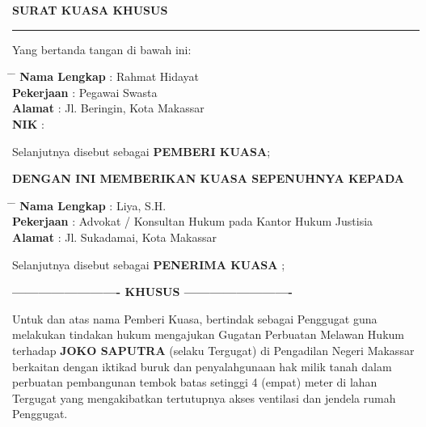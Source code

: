 \documentclass{article}
\begin{document}
\begin{center}
    {\large \textbf{SURAT KUASA KHUSUS}} \\[0.5em]
    \rule{8cm}{0.4pt}
\end{center}

Yang bertanda tangan di bawah ini:
\begin{tabbing}
    \hspace{3cm} \= \hspace{1cm} \= \kill
    \textbf{Nama Lengkap} \> : \> Rahmat Hidayat \\
    \textbf{Pekerjaan} \> : \> Pegawai Swasta \\
    \textbf{Alamat} \> : \> Jl. Beringin, Kota Makassar \\
    \textbf{NIK} \> : 
\end{tabbing}

Selanjutnya disebut sebagai \textbf{PEMBERI KUASA};

\vspace{1em}
\begin{center}
    \textbf{DENGAN INI MEMBERIKAN KUASA SEPENUHNYA KEPADA}
\end{center}
\vspace{0.5em}

\begin{tabbing}
    \hspace{3cm} \= \hspace{1cm} \= \kill
    \textbf{Nama Lengkap} \> : \> Liya, S.H. \\
    \textbf{Pekerjaan} \> : \> Advokat / Konsultan Hukum pada Kantor Hukum Justisia \\
    \textbf{Alamat} \> : \> Jl. Sukadamai, Kota Makassar \\
\end{tabbing}

Selanjutnya disebut sebagai \textbf{ PENERIMA KUASA };

\vspace{1em}
\begin{center}
    \textbf{------------------------- KHUSUS -------------------------}
\end{center}
\vspace{0.5em}

Untuk dan atas nama Pemberi Kuasa, bertindak sebagai Penggugat guna melakukan tindakan hukum mengajukan Gugatan Perbuatan Melawan Hukum terhadap \textbf{JOKO SAPUTRA} (selaku Tergugat) di Pengadilan Negeri Makassar berkaitan dengan iktikad buruk dan penyalahgunaan hak milik tanah dalam perbuatan pembangunan tembok batas setinggi 4 (empat) meter di lahan Tergugat yang mengakibatkan tertutupnya akses ventilasi dan jendela rumah Penggugat.
\end{document}
